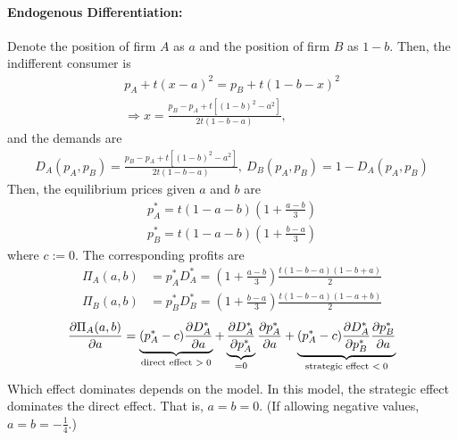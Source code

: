 \documentclass[11pt]{elegantbook}
\begin{document}
\paragraph*{Endogenous Differentiation:}
Denote the position of firm $A$ as $a$ and the position of firm $B$ as $1-b$. Then, the indifferent consumer is
\begin{equation}
    \begin{aligned}
        p_A+t(x-a)^2=p_B+t(1-b-x)^2\\
        \Rightarrow x=\frac{p_B-p_A+t\left[(1-b)^2-a^2\right]}{2t(1-b-a)},
    \end{aligned}
    \nonumber
\end{equation}
and the demands are
\begin{equation}
    \begin{aligned}
        D_A(p_A,p_B)=\frac{p_B-p_A+t\left[(1-b)^2-a^2\right]}{2t(1-b-a)},\
        D_B(p_A,p_B)=1-D_A(p_A,p_B)
    \end{aligned}
    \nonumber
\end{equation}
Then, the equilibrium prices given $a$ and $b$ are
\begin{equation}
    \begin{aligned}
        p_A^*=t(1-a-b)\left(1+\frac{a-b}{3}\right)\\
        p_B^*=t(1-a-b)\left(1+\frac{b-a}{3}\right)
    \end{aligned}
    \nonumber
\end{equation}
where $c:=0$. The corresponding profits are
\begin{equation}
    \begin{aligned}
        \Pi_A(a,b)&=p_A^*D_A^*=\left(1+\frac{a-b}{3}\right)\frac{t(1-b-a)(1-b+a)}{2}\\
        \Pi_B(a,b)&=p_B^*D_B^*=\left(1+\frac{b-a}{3}\right)\frac{t(1-b-a)(1-a+b)}{2}
    \end{aligned}
    \nonumber
\end{equation}
\begin{equation}
    \begin{aligned}
        \frac{\partial \Pi_A(a,b)}{\partial a}=\underbrace{(p_A^*-c)\frac{\partial D_A^*}{\partial a}}_\textnormal{direct effect $>0$}+\underbrace{\frac{\partial D_A^*}{\partial p_A^*}}_{=0}\frac{\partial p_A^*}{\partial a}+\underbrace{(p_A^*-c)\frac{\partial D_A^*}{\partial p_B^*}\frac{\partial p_B^*}{\partial a}}_\textnormal{strategic effect $<0$}
    \end{aligned}
    \nonumber
\end{equation}
Which effect dominates depends on the model. In this model, the strategic effect dominates the direct effect. That is, $a=b=0$. (If allowing negative values, $a=b=-\frac{1}{4}$.)
\end{document}
